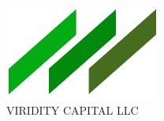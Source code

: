 \begin{titlepage}
  \begin{flushright}
    {\huge\textbf{\projectname{}}}\\
    \vspace{12pt}
    {\large \projectDescription} \\
  \end{flushright}

  \vspace{3.0in}
  \begin{center}
    \includegraphics[width=2.0in]{logo.png}\\
    \Huge{VIRIDITY CAPITAL LLC}
  \end{center}

\end{titlepage}